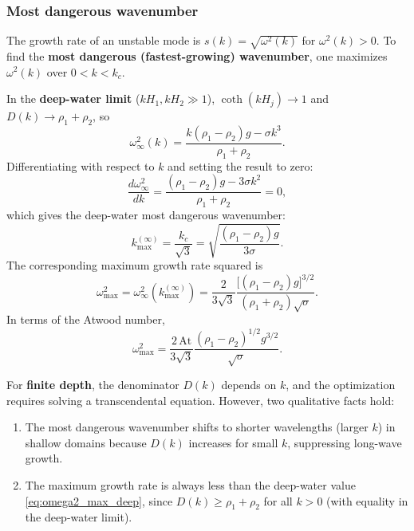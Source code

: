 \documentclass[11pt,a4paper]{article}
\begin{document}
\subsubsection{Most dangerous wavenumber}

The growth rate of an unstable mode is $s(k) = \sqrt{\omega^2(k)}$ for $\omega^2(k)>0$.  To find the \textbf{most dangerous (fastest-growing) wavenumber}, one maximizes $\omega^2(k)$ over $0<k<k_c$.

In the \textbf{deep-water limit} ($kH_1,kH_2\gg 1$), $\coth(kH_j)\to 1$ and $D(k)\to\rho_1+\rho_2$, so
\begin{equation}
    \omega^2_{\infty}(k)
    =
    \frac{k(\rho_1-\rho_2)g - \sigma k^3}{\rho_1+\rho_2}.
    \label{eq:omega2_deep}
\end{equation}
Differentiating with respect to $k$ and setting the result to zero:
\begin{equation}
    \frac{d\omega^2_{\infty}}{dk}
    =
    \frac{(\rho_1-\rho_2)g - 3\sigma k^2}{\rho_1+\rho_2}
    =
    0,
\end{equation}
which gives the deep-water most dangerous wavenumber:
\begin{equation}
    \boxed{
    k_{\max}^{(\infty)} = \frac{k_c}{\sqrt{3}} = \sqrt{\frac{(\rho_1-\rho_2)g}{3\sigma}}.
    }
    \label{eq:k_max_deep}
\end{equation}
The corresponding maximum growth rate squared is
\begin{equation}
    \omega^2_{\max}
    =
    \omega^2_{\infty}(k_{\max}^{(\infty)})
    =
    \frac{2}{3\sqrt{3}}
    \frac{\bigl[(\rho_1-\rho_2)g\bigr]^{3/2}}
    {(\rho_1+\rho_2)\sqrt{\sigma}}.
    \label{eq:omega2_max_deep}
\end{equation}
In terms of the Atwood number,
\begin{equation}
    \omega^2_{\max}
    =
    \frac{2\,\mathrm{At}}{3\sqrt{3}}
    \frac{(\rho_1-\rho_2)^{1/2}g^{3/2}}
    {\sqrt{\sigma}}.
\end{equation}

For \textbf{finite depth}, the denominator $D(k)$ depends on $k$, and the optimization requires solving a transcendental equation.  However, two qualitative facts hold:
\begin{enumerate}[leftmargin=*]
    \item The most dangerous wavenumber shifts to shorter wavelengths (larger $k$) in shallow domains because $D(k)$ increases for small $k$, suppressing long-wave growth.
    \item The maximum growth rate is always less than the deep-water value \eqref{eq:omega2_max_deep}, since $D(k)\ge\rho_1+\rho_2$ for all $k>0$ (with equality in the deep-water limit).
\end{enumerate}
\end{document}
